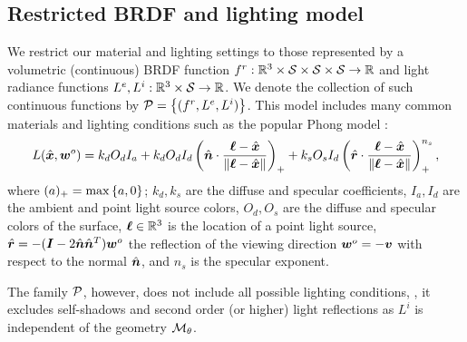 \documentclass[runningheads]{llncs}
\begin{document}
\subsection{Restricted BRDF and lighting model}
We restrict our material and lighting settings to those represented by a volumetric (continuous) BRDF function $f^r:\mathbb R^3\times {\mathcal{S}} \times {\mathcal{S}} \times {\mathcal{S}}\rightarrow \mathbb R$ and light radiance functions $L^e,L^i:\mathbb R^3\times {\mathcal{S}} \rightarrow \mathbb R$. We denote the collection of such continuous functions by ${\mathcal{P}}=\left\{(f^r,L^e,L^i)\right\}$. This model includes many common materials and lighting conditions such as the popular Phong model \cite{foley1996computer}:
\begin{equation}\label{e:phong}
    L({\hat{\bm{x}}},{\bm{w}}^o)=k_d O_d I_a + k_d O_d I_d\left ({\hat{\bm{n}}}\cdot \frac{{\bm{\ell}}-{\hat{\bm{x}}}}{\left\Vert{\bm{\ell}}-{\hat{\bm{x}}}\right\Vert}\right )_+ + k_s O_s I_d \left ({\hat{\bm{r}}}\cdot \frac{{\bm{\ell}}-{\hat{\bm{x}}}}{\left\Vert{\bm{\ell}}-{\hat{\bm{x}}}\right\Vert}\right )_+^{n_s},
\end{equation}
where $(a)_+=\max\left\{a,0\right\}$; $k_d,k_s$ are the diffuse and specular coefficients, $I_a,I_d$ are the ambient and point light source colors, $O_d,O_s$ are the diffuse and specular colors of the surface, ${\bm{\ell}}\in\mathbb R^3$ is the location of a point light source, ${\hat{\bm{r}}}=-({\bm{I}}-2{\hat{\bm{n}}}{\hat{\bm{n}}}^T){\bm{w}}^o$ the reflection of the viewing direction ${\bm{w}}^o=-{\bm{v}}$ with respect to the normal ${\hat{\bm{n}}}$, and $n_s$ is the specular exponent. 

The family ${\mathcal{P}}$, however, does not include all possible lighting conditions, \eg, it excludes self-shadows and second order (or higher)  light reflections as $L^i$ is independent of the geometry ${\mathcal{M}}_\theta$. 
\end{document}
